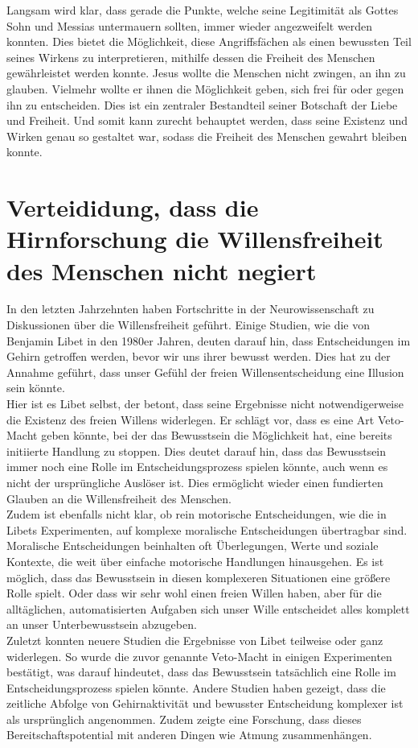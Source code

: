 Langsam wird klar, dass gerade die Punkte, welche seine Legitimität als Gottes Sohn und Messias untermauern sollten, immer wieder angezweifelt werden konnten. Dies bietet die Möglichkeit, diese Angriffsfächen als einen bewussten Teil seines Wirkens zu interpretieren, mithilfe dessen die Freiheit des Menschen gewährleistet werden konnte. Jesus wollte die Menschen nicht zwingen, an ihn zu glauben. Vielmehr wollte er ihnen die Möglichkeit geben, sich frei für oder gegen ihn zu entscheiden. Dies ist ein zentraler Bestandteil seiner Botschaft der Liebe und Freiheit. Und somit kann zurecht behauptet werden, dass seine Existenz und Wirken genau so gestaltet war, sodass die Freiheit des Menschen gewahrt bleiben konnte.\\

\section{Verteididung, dass die Hirnforschung die Willensfreiheit des Menschen nicht negiert}
In den letzten Jahrzehnten haben Fortschritte in der Neurowissenschaft zu Diskussionen über die Willensfreiheit geführt. Einige Studien, wie die von Benjamin Libet in den 1980er Jahren, deuten darauf hin, dass Entscheidungen im Gehirn getroffen werden, bevor wir uns ihrer bewusst werden. Dies hat zu der Annahme geführt, dass unser Gefühl der freien Willensentscheidung eine Illusion sein könnte.\\
Hier ist es Libet selbst, der betont, dass seine Ergebnisse nicht notwendigerweise die Existenz des freien Willens widerlegen. Er schlägt vor, dass es eine Art \glqq Veto-Macht\grqq{} geben könnte, bei der das Bewusstsein die Möglichkeit hat, eine bereits initiierte Handlung zu stoppen. Dies deutet darauf hin, dass das Bewusstsein immer noch eine Rolle im Entscheidungsprozess spielen könnte, auch wenn es nicht der ursprüngliche Auslöser ist. Dies ermöglicht wieder einen fundierten Glauben an die Willensfreiheit des Menschen.\\
Zudem ist ebenfalls nicht klar, ob rein motorische Entscheidungen, wie die in Libets Experimenten, auf komplexe moralische Entscheidungen übertragbar sind. Moralische Entscheidungen beinhalten oft Überlegungen, Werte und soziale Kontexte, die weit über einfache motorische Handlungen hinausgehen. Es ist möglich, dass das Bewusstsein in diesen komplexeren Situationen eine größere Rolle spielt. Oder dass wir sehr wohl einen freien Willen haben, aber für die alltäglichen, automatisierten Aufgaben sich unser Wille entscheidet alles komplett an unser Unterbewusstsein abzugeben.\\
Zuletzt konnten neuere Studien die Ergebnisse von Libet teilweise oder ganz widerlegen. So wurde die zuvor genannte Veto-Macht in einigen Experimenten bestätigt, was darauf hindeutet, dass das Bewusstsein tatsächlich eine Rolle im Entscheidungsprozess spielen könnte. Andere Studien haben gezeigt, dass die zeitliche Abfolge von Gehirnaktivität und bewusster Entscheidung komplexer ist als ursprünglich angenommen. Zudem zeigte eine Forschung, dass dieses Bereitschaftspotential mit anderen Dingen wie Atmung zusammenhängen.\\

